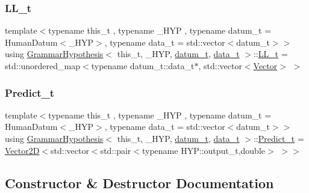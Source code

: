\subsubsection{\texorpdfstring{L\+L\+\_\+t}{LL\_t}}
{\footnotesize\ttfamily template$<$typename this\+\_\+t , typename \+\_\+\+H\+YP , typename datum\+\_\+t  = Human\+Datum$<$\+\_\+\+H\+Y\+P$>$, typename data\+\_\+t  = std\+::vector$<$datum\+\_\+t$>$$>$ \\
using \hyperlink{class_grammar_hypothesis}{Grammar\+Hypothesis}$<$ this\+\_\+t, \+\_\+\+H\+YP, \hyperlink{class_bayesable_a9f1a6c0cd7855550fa10b1a8f13a5867}{datum\+\_\+t}, \hyperlink{class_bayesable_aa2788c4d7718c0a824e1d28c4c98f921}{data\+\_\+t} $>$\+::\hyperlink{class_grammar_hypothesis_a7c6a6c59b0ba1ca6e225079d0cb7143b}{L\+L\+\_\+t} =  std\+::unordered\+\_\+map$<$typename datum\+\_\+t\+::data\+\_\+t$\ast$, std\+::vector$<$\hyperlink{_eigen_lib_8h_aca2956bc379bce2ed88ab3c0e1b61d1d}{Vector}$>$ $>$}

\mbox{\label{class_grammar_hypothesis_aa5ecc4d2215fa50a9c2b4e7c682c7cd7}} 
\subsubsection{\texorpdfstring{Predict\+\_\+t}{Predict\_t}}
{\footnotesize\ttfamily template$<$typename this\+\_\+t , typename \+\_\+\+H\+YP , typename datum\+\_\+t  = Human\+Datum$<$\+\_\+\+H\+Y\+P$>$, typename data\+\_\+t  = std\+::vector$<$datum\+\_\+t$>$$>$ \\
using \hyperlink{class_grammar_hypothesis}{Grammar\+Hypothesis}$<$ this\+\_\+t, \+\_\+\+H\+YP, \hyperlink{class_bayesable_a9f1a6c0cd7855550fa10b1a8f13a5867}{datum\+\_\+t}, \hyperlink{class_bayesable_aa2788c4d7718c0a824e1d28c4c98f921}{data\+\_\+t} $>$\+::\hyperlink{class_grammar_hypothesis_aa5ecc4d2215fa50a9c2b4e7c682c7cd7}{Predict\+\_\+t} =  \hyperlink{struct_vector2_d}{Vector2D}$<$std\+::vector$<$std\+::pair$<$typename H\+Y\+P\+::output\+\_\+t,double$>$ $>$$>$}



\subsection{Constructor \& Destructor Documentation}
\mbox{\label{class_grammar_hypothesis_a83e43512aae4bfcbd0e3907a62c71132}} 
